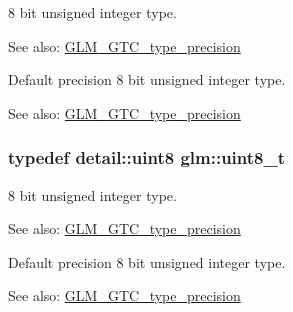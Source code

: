 8 bit unsigned integer type. \begin{Desc}
\item[See also:]\hyperlink{group__gtc__type__precision}{GLM\_\-GTC\_\-type\_\-precision}\end{Desc}
Default precision 8 bit unsigned integer type. \begin{Desc}
\item[See also:]\hyperlink{group__gtc__type__precision}{GLM\_\-GTC\_\-type\_\-precision} \end{Desc}
\hypertarget{group__gtc__type__precision_g93adf6dd9803408f3e3aaf9dedda352b}{
\subsubsection[uint8\_\-t]{\setlength{\rightskip}{0pt plus 5cm}typedef detail::uint8 {\bf glm::uint8\_\-t}}}
\label{group__gtc__type__precision_g93adf6dd9803408f3e3aaf9dedda352b}


8 bit unsigned integer type. \begin{Desc}
\item[See also:]\hyperlink{group__gtc__type__precision}{GLM\_\-GTC\_\-type\_\-precision}\end{Desc}
Default precision 8 bit unsigned integer type. \begin{Desc}
\item[See also:]\hyperlink{group__gtc__type__precision}{GLM\_\-GTC\_\-type\_\-precision} \end{Desc}
